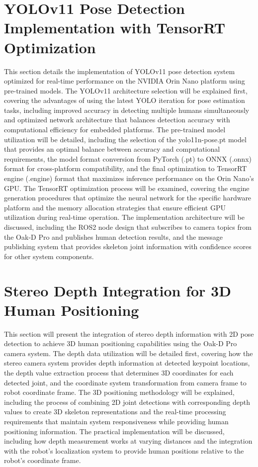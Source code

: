 \section{YOLOv11 Pose Detection Implementation with TensorRT Optimization}
This section details the implementation of YOLOv11 pose detection system optimized for real-time performance on the NVIDIA Orin Nano platform using pre-trained models. The YOLOv11 architecture selection will be explained first, covering the advantages of using the latest YOLO iteration for pose estimation tasks, including improved accuracy in detecting multiple humans simultaneously and optimized network architecture that balances detection accuracy with computational efficiency for embedded platforms. The pre-trained model utilization will be detailed, including the selection of the yolo11n-pose.pt model that provides an optimal balance between accuracy and computational requirements, the model format conversion from PyTorch (.pt) to ONNX (.onnx) format for cross-platform compatibility, and the final optimization to TensorRT engine (.engine) format that maximizes inference performance on the Orin Nano's GPU. The TensorRT optimization process will be examined, covering the engine generation procedures that optimize the neural network for the specific hardware platform and the memory allocation strategies that ensure efficient GPU utilization during real-time operation. The implementation architecture will be discussed, including the ROS2 node design that subscribes to camera topics from the Oak-D Pro and publishes human detection results, and the message publishing system that provides skeleton joint information with confidence scores for other system components.

\section{Stereo Depth Integration for 3D Human Positioning}
This section will present the integration of stereo depth information with 2D pose detection to achieve 3D human positioning capabilities using the Oak-D Pro camera system. The depth data utilization will be detailed first, covering how the stereo camera system provides depth information at detected keypoint locations, the depth value extraction process that determines 3D coordinates for each detected joint, and the coordinate system transformation from camera frame to robot coordinate frame. The 3D positioning methodology will be explained, including the process of combining 2D joint detections with corresponding depth values to create 3D skeleton representations and the real-time processing requirements that maintain system responsiveness while providing human positioning information. The practical implementation will be discussed, including how depth measurement works at varying distances and the integration with the robot's localization system to provide human positions relative to the robot's coordinate frame.

